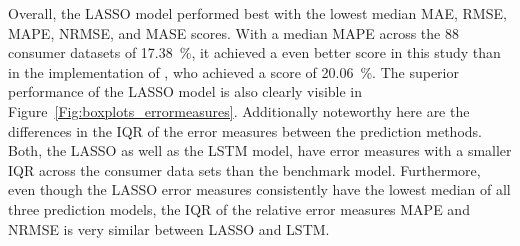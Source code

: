 Overall, the LASSO model performed best with the lowest median MAE, RMSE, MAPE, NRMSE, and MASE scores. With a median MAPE across the 88 consumer datasets of 17.38~\%, it achieved a even better score in this study than in the implementation of \citet{Li:2017}, who achieved a score of 20.06~\%. The superior performance of the LASSO model is also clearly visible in Figure~\ref{Fig:boxplots_errormeasures}. Additionally noteworthy here are the differences in the IQR of the error measures between the prediction methods. Both, the LASSO as well as the LSTM model, have error measures with a smaller IQR across the consumer data sets than the benchmark model. Furthermore, even though the LASSO error measures consistently have the lowest median of all three prediction models, the IQR of the relative error measures MAPE and NRMSE is very similar between LASSO and LSTM.
%

